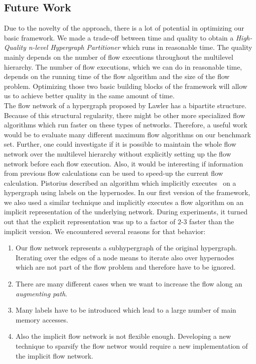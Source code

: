 \subsection{Future Work}

Due to the novelty of the approach, there is a lot of potential in optimizing our basic 
framework. We made a trade-off between time and quality to obtain a \emph{High-Quality 
n-level Hypergraph Partitioner} which runs in reasonable time. The quality mainly depends
on the number of flow executions throughout the multilevel hierarchy. The number of flow
executions, which we can do in reasonable time, depends on the running time of the 
flow algorithm and the size of the flow problem. Optimizing those two basic building 
blocks of the framework will allow us to achieve better quality in the same amount of time.\\
The flow network of a hypergraph proposed by Lawler \cite{lawler1973} has a bipartite 
structure. Because of this structural regularity, there might be other more specialized
flow algorithms which run faster on these types of networks. Therefore, a useful work 
would be to evaluate many different maximum flow algorithms on our benchmark set. Further,
one could investigate if it is possible to maintain the whole flow network over the
multilevel hierarchy without explicitly setting up the flow network before each flow
execution. Also, it would be interesting if information from previous flow calculations can 
be used to speed-up the current flow calculation. Pistorius \cite{pistorius2003} described
an algorithm which implicitly executes \EdmondKarp~on a hypergraph using
labels on the hypernodes. In our first version of the framework, we also used a similar 
technique and implicitly executes a flow algorithm on an implicit representation of 
the underlying network. During experiments, it turned out that the explicit representation
was up to a factor of $2$-$3$ faster than the implicit version. We encountered several reasons
for that behavior: 
\begin{enumerate}
\item Our flow network represents a subhypergraph of the original hypergraph. Iterating 
      over the edges of a node means to iterate also over hypernodes which are not part of 
      the flow problem and therefore have to be ignored.
\item There are many different cases when we want to increase the flow along an 
      \emph{augmenting path}.
\item Many labels have to be introduced which lead to a large number of 
      main memory accesses.
\item Also the implicit flow network is not flexible enough. Developing a new 
      technique to sparsify the flow networ would require a new implementation of 
      the implicit flow network.
\end{enumerate}
